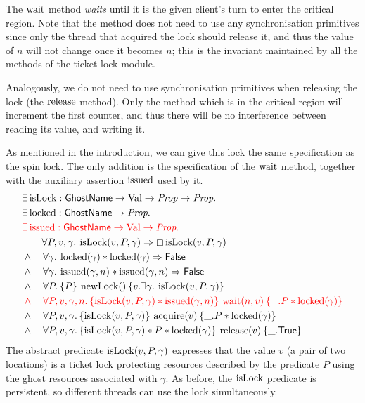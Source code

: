 The $\operatorname{wait}$ method \emph{waits} until it is the given client's turn to enter the critical region.
Note that the method does not need to use any synchronisation primitives since only the thread that acquired the lock should release it, and thus the value of $n$ will not change once it becomes $n$; this is the invariant maintained by all the methods of the ticket lock module.

Analogously, we do not need to use synchronisation primitives when releasing the lock (the $\operatorname{release}$ method).
Only the method which is in the critical region will increment the first counter, and thus there will be no interference between reading its value, and writing it.

As mentioned in the introduction, we can give this lock the same specification as the spin lock.
The only addition is the specification of the $\operatorname{wait}$ method, together with the auxiliary assertion $\operatorname{issued}$ used by it.
\begin{align*}
  &\Exists \isLock : \textlog{GhostName} \to \Val \to \Prop \to \Prop.\nonumber\\
  &\Exists \locked : \textlog{GhostName} \to \Prop.\nonumber\\
  &\color{red} \Exists \issued : \textlog{GhostName} \to \Val \to \Prop.\nonumber\\
  &\quad\quad\All P, v, \gamma. \isLock(v, P, \gamma) \implies \persistently \isLock(v, P, \gamma)\\
  &\land\quad\All \gamma. \locked(\gamma) \ast \locked(\gamma) \implies \FALSE\\
  &\land\quad\All \gamma. \issued(\gamma,n) \ast \issued(\gamma,n) \implies \FALSE\\
  &\land\quad\All P.\hoare{P}{\newLock ()}{v.\Exists \gamma.\isLock(v, P, \gamma)}\\
  &\color{red}\land\quad\All P, v, \gamma, n.\hoare{\isLock(v, P, \gamma) \ast \issued(\gamma, n)}{\wait (n, v)}{\_.P \ast \locked(\gamma)}\\
  &\land\quad\All P, v, \gamma.\hoare{\isLock(v, P, \gamma)}{\acquire (v)}{\_.P \ast \locked(\gamma)}\\
  &\land\quad\All P, v, \gamma.\hoare{\isLock(v, P, \gamma) \ast P \ast \locked(\gamma)}{\release (v)}{\_.\TRUE}
\end{align*}
The abstract predicate $\operatorname{isLock}(v, P, \gamma)$ expresses that the value $v$ (a pair of two locations) is a ticket lock protecting resources described by the predicate $P$ using the ghost resources associated with $\gamma$.
As before, the $\operatorname{isLock}$ predicate is persistent, so different threads can use the lock simultaneously.

